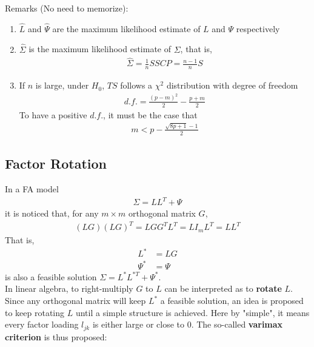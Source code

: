 \documentclass[12pt]{extarticle}
\newcommand{\<}{\langle}
\renewcommand{\>}{\rangle}
\theoremstyle{definition}
\begin{document}
Remarks (No need to memorize):
\begin{enumerate}
    \item $\hat{L}$ and $\hat{\Psi}$ are the maximum likelihood estimate of $L$ and $\Psi$ respectively
    \item $\hat{\Sigma}$ is the maximum likelihood estimate of $\Sigma$, that is,
    \begin{align*}
        \hat{\Sigma}=\frac{1}{n}SSCP=\frac{n-1}{n}S
    \end{align*}
    \item If $n$ is large, under $H_0$, $TS$ follows a $\chi^2$ distribution with degree of freedom
    \begin{align*}
        d.f.=\frac{(p-m)^2}{2}-\frac{p+m}{2}
    \end{align*}
    To have a positive $d.f.$, it must be the case that
    \begin{align*}
        m<p-\frac{\sqrt{8p+1}-1}{2}
    \end{align*}
\end{enumerate}

\newpage
\subsection{Factor Rotation}
In a FA model
\begin{align*}
    \Sigma = LL^T +\Psi
\end{align*}
it is noticed that, for any $m\times m$ orthogonal matrix $G$,
\begin{align*}
    (LG)(LG)^T =LGG^T L^T = LI_m L^T = LL^T
\end{align*}
That is,
\begin{align*}
    L^* &= LG\\
    \Psi^* &= \Psi
\end{align*}
is also a feasible solution $\Sigma = L^*L^{*T} +\Psi^*$.\\
In linear algebra, to right-multiply $G$ to $L$ can be interpreted as to \textbf{rotate} $L$.\\

Since any orthogonal matrix will keep $L^*$ a feasible solution, an idea is proposed to keep rotating $L$ until a simple structure is achieved. Here by "simple", it means every factor loading $l_{jk}$ is either large or close to 0. The so-called \textbf{varimax criterion} is thus proposed:
\end{document}
